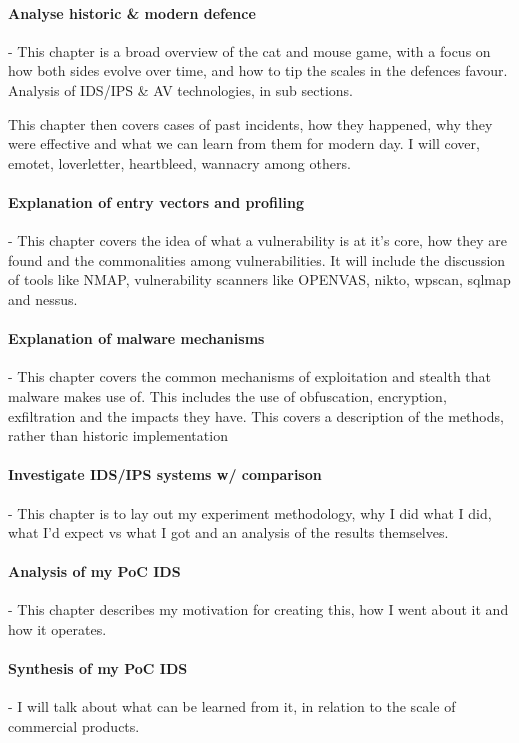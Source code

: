 \paragraph{Analyse historic \& modern defence} - This chapter is a broad overview of the cat and mouse game, with a focus on how both sides evolve over time, 
and how to tip the scales in the defences favour. Analysis of IDS/IPS & AV technologies, in sub sections. 

This chapter then covers cases of past incidents, how they happened, why they were effective and what we can learn from them for modern day. 
I will cover, emotet, loverletter, heartbleed, wannacry among others. 

\paragraph{Explanation of entry vectors and profiling} - This chapter covers the idea of what a vulnerability is at it's core, how they are found
and the commonalities among vulnerabilities. It will include the discussion of tools like NMAP, vulnerability scanners like OPENVAS, nikto, wpscan, sqlmap and nessus.

\paragraph{Explanation of malware mechanisms} - This chapter covers the common mechanisms of exploitation and stealth that malware makes use of. 
This includes the use of obfuscation, encryption, exfiltration and the impacts they have. This covers a description of the methods, rather than historic implementation

\paragraph{Investigate IDS/IPS systems w/ comparison} - This chapter is to lay out my experiment methodology, why I did what I did, what I'd expect vs what I got and an analysis of the results themselves.

\paragraph{Analysis of my PoC IDS} - This chapter describes my motivation for creating this, how I went about it and how it operates. 

\paragraph{Synthesis of my PoC IDS} - I will talk about what can be learned from it, in relation to the scale of commercial products. 

